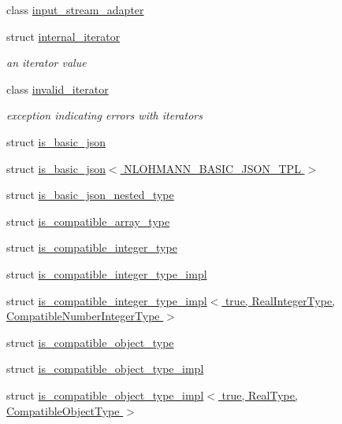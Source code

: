 \begin{DoxyCompactItemize}
class \hyperlink{classnlohmann_1_1detail_1_1input__stream__adapter}{input\+\_\+stream\+\_\+adapter}
\item 
struct \hyperlink{structnlohmann_1_1detail_1_1internal__iterator}{internal\+\_\+iterator}
\begin{DoxyCompactList}\small\item\em an iterator value \end{DoxyCompactList}\item 
class \hyperlink{classnlohmann_1_1detail_1_1invalid__iterator}{invalid\+\_\+iterator}
\begin{DoxyCompactList}\small\item\em exception indicating errors with iterators \end{DoxyCompactList}\item 
struct \hyperlink{structnlohmann_1_1detail_1_1is__basic__json}{is\+\_\+basic\+\_\+json}
\item 
struct \hyperlink{structnlohmann_1_1detail_1_1is__basic__json_3_01NLOHMANN__BASIC__JSON__TPL_01_4}{is\+\_\+basic\+\_\+json$<$ N\+L\+O\+H\+M\+A\+N\+N\+\_\+\+B\+A\+S\+I\+C\+\_\+\+J\+S\+O\+N\+\_\+\+T\+P\+L $>$}
\item 
struct \hyperlink{structnlohmann_1_1detail_1_1is__basic__json__nested__type}{is\+\_\+basic\+\_\+json\+\_\+nested\+\_\+type}
\item 
struct \hyperlink{structnlohmann_1_1detail_1_1is__compatible__array__type}{is\+\_\+compatible\+\_\+array\+\_\+type}
\item 
struct \hyperlink{structnlohmann_1_1detail_1_1is__compatible__integer__type}{is\+\_\+compatible\+\_\+integer\+\_\+type}
\item 
struct \hyperlink{structnlohmann_1_1detail_1_1is__compatible__integer__type__impl}{is\+\_\+compatible\+\_\+integer\+\_\+type\+\_\+impl}
\item 
struct \hyperlink{structnlohmann_1_1detail_1_1is__compatible__integer__type__impl_3_01true_00_01RealIntegerType_0064332c4ada80cab3523aebd66ccc012a}{is\+\_\+compatible\+\_\+integer\+\_\+type\+\_\+impl$<$ true, Real\+Integer\+Type, Compatible\+Number\+Integer\+Type $>$}
\item 
struct \hyperlink{structnlohmann_1_1detail_1_1is__compatible__object__type}{is\+\_\+compatible\+\_\+object\+\_\+type}
\item 
struct \hyperlink{structnlohmann_1_1detail_1_1is__compatible__object__type__impl}{is\+\_\+compatible\+\_\+object\+\_\+type\+\_\+impl}
\item 
struct \hyperlink{structnlohmann_1_1detail_1_1is__compatible__object__type__impl_3_01true_00_01RealType_00_01CompatibleObjectType_01_4}{is\+\_\+compatible\+\_\+object\+\_\+type\+\_\+impl$<$ true, Real\+Type, Compatible\+Object\+Type $>$}

\end{DoxyCompactItemize}

